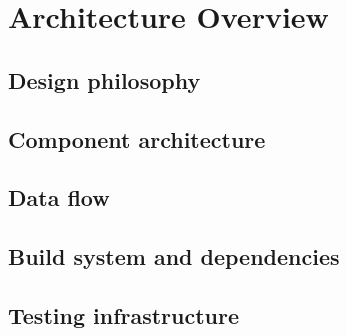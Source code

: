 \chapter{Architecture Overview}
\label{ch:architecture}

\section{Design philosophy}
\label{sec:arch:philosophy}


\section{Component architecture}
\label{sec:arch:components}


\section{Data flow}
\label{sec:arch:dataflow}


\section{Build system and dependencies}
\label{sec:arch:build}


\section{Testing infrastructure}
\label{sec:arch:testing}

